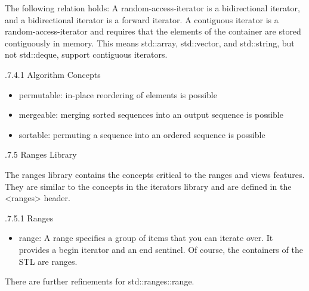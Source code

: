 The following relation holds: A random-access-iterator is a bidirectional iterator, and a bidirectional iterator is a forward iterator. A contiguous iterator is a random-access-iterator and requires that the elements of the container are stored contiguously in memory. This means std::array, std::vector, and std::string, but not std::deque, support contiguous iterators.

.7.4.1\hspace{0.2cm} Algorithm Concepts

\begin{itemize}
\item 
permutable: in-place reordering of elements is possible

\item 
mergeable: merging sorted sequences into an output sequence is possible

\item 
sortable: permuting a sequence into an ordered sequence is possible
\end{itemize}

.7.5\hspace{0.2cm} Ranges Library

The ranges library contains the concepts critical to the ranges and views features. They are similar to the concepts in the iterators library and are defined in the <ranges> header.

.7.5.1\hspace{0.2cm} Ranges

\begin{itemize}
\item 
range: A range specifies a group of items that you can iterate over. It provides a begin iterator and an end sentinel. Of course, the containers of the STL are ranges.
\end{itemize}

There are further refinements for std::ranges::range.

